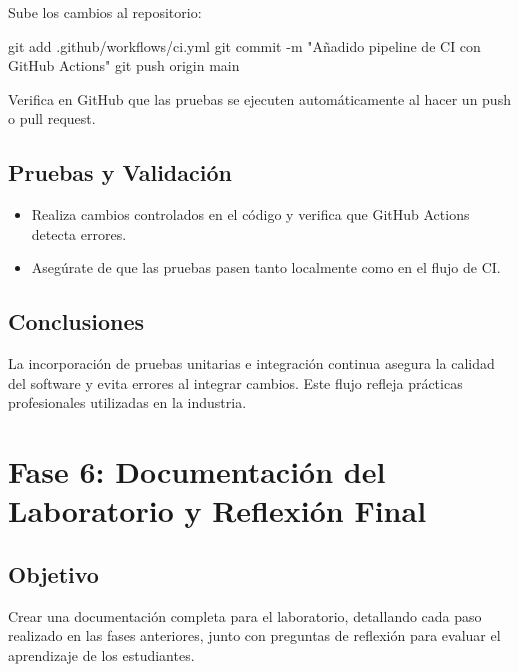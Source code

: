 \documentclass[
  a4paper,
  DIV=11,
  numbers=noendperiod,
  onepage,
  openany]{scrreprt}
\newenvironment{Shaded}{\begin{snugshade}}{\end{snugshade}}
\newcommand{\AttributeTok}[1]{\textcolor[rgb]{0.40,0.45,0.13}{#1}}
\newcommand{\FunctionTok}[1]{\textcolor[rgb]{0.28,0.35,0.67}{#1}}
\newcommand{\NormalTok}[1]{\textcolor[rgb]{0.00,0.23,0.31}{#1}}
\newcommand{\StringTok}[1]{\textcolor[rgb]{0.13,0.47,0.30}{#1}}
\providecommand{\tightlist}{%
  \setlength{\itemsep}{0pt}\setlength{\parskip}{0pt}}\usepackage{longtable,booktabs,array}
\begin{document}
Sube los cambios al repositorio:

\begin{Shaded}
\begin{Highlighting}[]
\FunctionTok{git}\NormalTok{ add .github/workflows/ci.yml}
\FunctionTok{git}\NormalTok{ commit }\AttributeTok{{-}m} \StringTok{"Añadido pipeline de CI con GitHub Actions"}
\FunctionTok{git}\NormalTok{ push origin main}
\end{Highlighting}
\end{Shaded}

Verifica en GitHub que las pruebas se ejecuten automáticamente al hacer
un push o pull request.

\section{Pruebas y Validación}\label{pruebas-y-validaciuxf3n}

\begin{itemize}
\tightlist
\item
  Realiza cambios controlados en el código y verifica que GitHub Actions
  detecta errores.
\item
  Asegúrate de que las pruebas pasen tanto localmente como en el flujo
  de CI.
\end{itemize}

\section{Conclusiones}\label{conclusiones-18}

La incorporación de pruebas unitarias e integración continua asegura la
calidad del software y evita errores al integrar cambios. Este flujo
refleja prácticas profesionales utilizadas en la industria.

\chapter{Fase 6: Documentación del Laboratorio y Reflexión
Final}\label{fase-6-documentaciuxf3n-del-laboratorio-y-reflexiuxf3n-final}

\section{Objetivo}\label{objetivo-6}

Crear una documentación completa para el laboratorio, detallando cada
paso realizado en las fases anteriores, junto con preguntas de reflexión
para evaluar el aprendizaje de los estudiantes.
\end{document}
